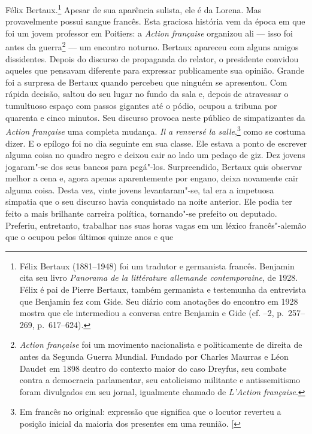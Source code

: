 Félix Bertaux.\footnote{Félix Bertaux (1881--1948) foi um tradutor e germanista francês. Benjamin cita seu livro \emph{Panorama de la littérature allemande contemporaine}, de 1928. Félix é pai de Pierre Bertaux, também germanista e testemunha da entrevista que Benjamin fez com Gide. Seu diário com anotações do encontro em 1928 mostra que ele intermediou a conversa entre Benjamin e Gide (cf. --2, p.~257--269, p.~617--624). \versal{[N.~O.]}} Apesar de sua aparência sulista,
ele é da Lorena. Mas provavelmente possui sangue francês. Esta graciosa
história vem da época em que foi um jovem professor em Poitiers: a
\emph{Action française} organizou ali --- isso foi antes da
guerra\footnote{\emph{Action française} foi um movimento %
  nacionalista e politicamente de direita de antes da Segunda Guerra Mundial.
  Fundado por Charles Maurras e Léon Daudet em 1898 dentro do
  contexto maior do caso Dreyfus, seu combate contra a democracia
  parlamentar, seu catolicismo militante e antissemitismo foram
  divulgados em seu jornal, igualmente chamado de \emph{L'Action
  française}. \versal{[N.~O.]}} --- um encontro noturno. Bertaux apareceu com alguns
amigos dissidentes. Depois do discurso de propaganda do relator, o
presidente convidou aqueles que pensavam diferente para expressar
publicamente sua opinião. Grande foi a surpresa de Bertaux quando
percebeu que ninguém se apresentou. Com rápida decisão, saltou do seu
lugar no fundo da sala e, depois de atravessar o tumultuoso espaço com
passos gigantes até o pódio, ocupou a tribuna por quarenta e cinco
minutos. Seu discurso provoca neste público de simpatizantes da
\emph{Action française} uma completa mudança. \emph{Il a renversé la
salle},\footnote{Em francês no original: expressão que significa que o locutor reverteu a posição inicial da maioria dos presentes em uma reunião. {[}\versal{N.~T.}{]}} como se costuma dizer. E o epílogo foi no dia seguinte em sua
classe. Ele estava a ponto de escrever alguma coisa no quadro negro e
deixou cair ao lado um pedaço de giz. Dez jovens jogaram"-se dos seus
bancos para pegá"-los. Surpreendido, Bertaux quis observar melhor a cena
e, agora apenas aparentemente por engano, deixa novamente cair alguma
coisa. Desta vez, vinte jovens levantaram"-se, tal era a impetuosa
simpatia que o seu discurso havia conquistado na noite anterior. Ele
podia ter feito a mais brilhante carreira política, tornando"-se
prefeito ou deputado. Preferiu, entretanto, trabalhar nas suas horas vagas
em um léxico francês"-alemão que o ocupou pelos últimos quinze anos e que
